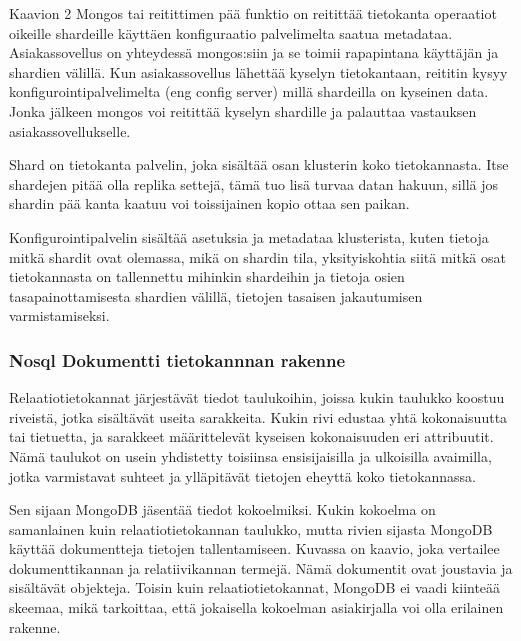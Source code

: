 

Kaavion 2 Mongos tai reitittimen pää funktio on reitittää tietokanta operaatiot oikeille shardeille käyttäen konfiguraatio palvelimelta saatua metadataa.
Asiakassovellus on yhteydessä mongos:siin ja se toimii rapapintana käyttäjän ja shardien välillä. 
Kun asiakassovellus lähettää kyselyn tietokantaan, reititin kysyy konfigurointipalvelimelta (eng config server) millä shardeilla on kyseinen data. 
Jonka jälkeen mongos voi reitittää kyselyn shardille ja palauttaa vastauksen asiakassovellukselle.
\medskip

Shard on tietokanta palvelin, joka sisältää osan klusterin koko tietokannasta.
Itse shardejen pitää olla replika settejä, 
tämä tuo lisä turvaa datan hakuun, sillä jos shardin pää kanta kaatuu voi toissijainen kopio ottaa sen paikan. 
\medskip



Konfigurointipalvelin sisältää asetuksia ja metadataa klusterista, 
kuten tietoja mitkä shardit ovat olemassa, mikä on shardin tila,
yksityiskohtia siitä mitkä osat tietokannasta on tallennettu mihinkin shardeihin
ja tietoja osien tasapainottamisesta shardien välillä, tietojen tasaisen jakautumisen varmistamiseksi.






\subsubsection{Nosql Dokumentti tietokannnan rakenne}




Relaatiotietokannat järjestävät tiedot taulukoihin,
joissa kukin taulukko koostuu riveistä, jotka sisältävät useita sarakkeita.
Kukin rivi edustaa yhtä kokonaisuutta tai tietuetta, ja sarakkeet määrittelevät kyseisen kokonaisuuden eri attribuutit.
Nämä taulukot on usein yhdistetty toisiinsa ensisijaisilla ja ulkoisilla avaimilla,
jotka varmistavat suhteet ja ylläpitävät tietojen eheyttä koko tietokannassa.
\medskip

Sen sijaan MongoDB jäsentää tiedot kokoelmiksi.
Kukin kokoelma on samanlainen kuin relaatiotietokannan taulukko,
mutta rivien sijasta MongoDB käyttää dokumentteja tietojen tallentamiseen.
Kuvassa \nextImageCount{} on kaavio, joka vertailee dokumenttikannan ja relatiivikannan termejä.
Nämä dokumentit ovat joustavia ja sisältävät objekteja.
Toisin kuin relaatiotietokannat, MongoDB ei vaadi kiinteää skeemaa, mikä tarkoittaa, 
että jokaisella kokoelman asiakirjalla voi olla erilainen rakenne.
\medskip

